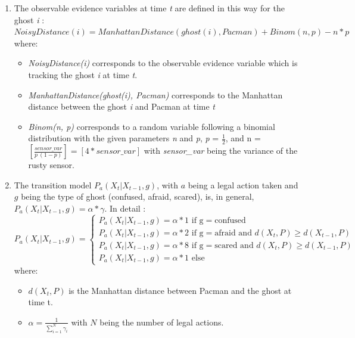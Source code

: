\documentclass{article}
\newcommand\round[1]{\left[#1\right]}
\begin{document}
\begin{enumerate}[label=\alph*.,leftmargin=*]
    \item The observable evidence variables at time \textit{t} are defined in
    this way for the ghost \textit{i} : \\
    
    $NoisyDistance(i) = 
    ManhattanDistance(ghost(i), Pacman) + Binom(n, p) - n * p$ \\

    where:
    \begin{itemize}
    	\item \textit{NoisyDistance(i)} corresponds to the observable evidence variable 
    which is tracking the ghost \textit{i} at time \textit{t}.
    	\item \textit{ManhattanDistance(ghost(i), Pacman)}
    corresponds to the Manhattan distance between the ghost \textit{i} and Pacman at time \textit{t}
    	\item \textit{Binom(n, p)} corresponds to a random variable following a binomial distribution with the given parameters
    \textit{n} and \textit{p}, \textit{p} = $\frac{1}{2}$, and n = $\round{\frac{sensor\_var}{p \ (1 - p)}} = \round{4 * sensor\_var}$ with \textit{sensor\_var} being the variance of the rusty sensor.
    \end{itemize}
    
    \item The transition model $P_a(X_t | X_{t-1}, g)$, with $a$ being a legal action taken and $g$ being the type of ghost (confused, afraid, scared), is, in general, $P_a(X_t | X_{t-1}, g) = \alpha * \gamma$. In detail :
    \[
  P_a(X_t | X_{t-1}, g)=\begin{cases}
               P_a(X_t | X_{t-1}, g) = \alpha * 1 \text{ if g} = \text{confused} \\
               P_a(X_t | X_{t-1}, g) = \alpha * 2 \text{ if g} = \text{afraid and }d(X_t, P) \geq d(X_{t-1},P) \\
               P_a(X_t | X_{t-1}, g) = \alpha * 8 \text{ if g} = \text{scared and }d(X_t, P) \geq d(X_{t-1},P) \\
               P_a(X_t | X_{t-1}, g) = \alpha * 1 \text{ else}
            \end{cases}
\]
where:
\begin{itemize}
	\item $d(X_t, P)$ is the Manhattan distance between Pacman and the ghost at time t.
	\item $\alpha = \frac{1}{\sum_{i=1}^N {\gamma_i}}$ with $N$ being the number of legal actions.
\end{itemize}

\end{enumerate}
\end{document}
